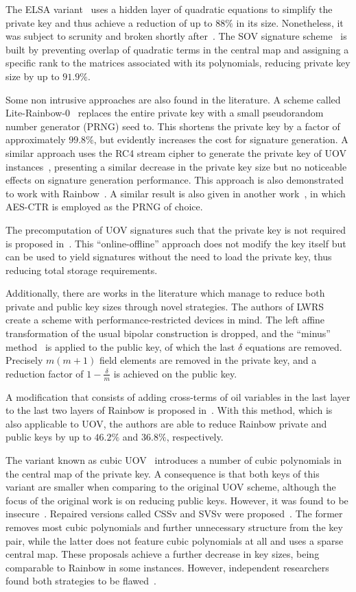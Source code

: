 \documentclass[draft, 12pt, a4paper, oneside]{memoir}
\begin{document}
The ELSA variant~\cite{} uses a hidden layer of quadratic equations to simplify the private key and thus achieve a reduction of up to $88\%$ in its size. Nonetheless, it was subject to scrunity and broken shortly after~\cite{}. The SOV signature scheme~\cite{} is built by preventing overlap of quadratic terms in the central map and assigning a specific rank to the matrices associated with its polynomials, reducing private key size by up to $91.9\%$.

Some non intrusive approaches are also found in the literature. A scheme called Lite-Rainbow-0~\cite{} replaces the entire private key with a small pseudorandom number generator (PRNG) seed to. This shortens the private key by a factor of approximately $99.8\%$, but evidently increases the cost for signature generation. A similar approach uses the RC4 stream cipher to generate the private key of UOV instances~\cite{}, presenting a similar decrease in the private key size but no noticeable effects on signature generation performance. This approach is also demonstrated to work with Rainbow~\cite{}. A similar result is also given in another work~\cite{}, in which AES-CTR is employed as the PRNG of choice.

The precomputation of UOV signatures such that the private key is not required is proposed in~\cite{}. This ``online-offline'' approach does not modify the key itself but can be used to yield signatures without the need to load the private key, thus reducing total storage requirements.

Additionally, there are works in the literature which manage to reduce both private and public key sizes through novel strategies. The authors of LWRS~\cite{} create a scheme with performance-restricted devices in mind. The left affine transformation of the usual bipolar construction is dropped, and the ``minus'' method~\cite[Subsection 3.2.1]{} is applied to the public key, of which the last $\delta$ equations are removed. Precisely $m (m + 1)$ field elements are removed in the private key, and a reduction factor of $1 - \frac{\delta}{m}$ is achieved on the public key.

A modification that consists of adding cross-terms of oil variables in the last layer to the last two layers of Rainbow is proposed in~\cite{}. With this method, which is also applicable to UOV, the authors are able to reduce Rainbow private and public keys by up to $46.2\%$ and $36.8\%$, respectively.

The variant known as cubic UOV~\cite{} introduces a number of cubic polynomials in the central map of the private key. A consequence is that both keys of this variant are smaller when comparing to the original UOV scheme, although the focus of the original work is on reducing public keys. However, it was found to be insecure~\cite{}. Repaired versions called CSSv and SVSv were proposed~\cite{}. The former removes most cubic polynomials and further unnecessary structure from the key pair, while the latter does not feature cubic polynomials at all and uses a sparse central map. These proposals achieve a further decrease in key sizes, being comparable to Rainbow in some instances. However, independent researchers found both strategies to be flawed~\cite{}.
\end{document}
